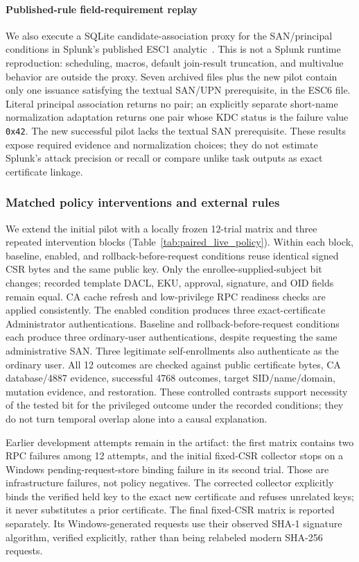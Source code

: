 \paragraph{Published-rule field-requirement replay}
We also execute a SQLite candidate-association proxy for the SAN/principal conditions in Splunk's published ESC1 analytic~\cite{splunk2026esc1}. This is not a Splunk runtime reproduction: scheduling, macros, default join-result truncation, and multivalue behavior are outside the proxy. Seven archived files plus the new pilot contain only one issuance satisfying the textual SAN/UPN prerequisite, in the ESC6 file. Literal principal association returns no pair; an explicitly separate short-name normalization adaptation returns one pair whose KDC status is the failure value \texttt{0x42}. The new successful pilot lacks the textual SAN prerequisite. These results expose required evidence and normalization choices; they do not estimate Splunk's attack precision or recall or compare unlike task outputs as exact certificate linkage.



\subsubsection{Matched policy interventions and external rules}
We extend the initial pilot with a locally frozen 12-trial matrix and three repeated intervention blocks (Table~\ref{tab:paired_live_policy}). Within each block, baseline, enabled, and rollback-before-request conditions reuse identical signed CSR bytes and the same public key. Only the enrollee-supplied-subject bit changes; recorded template DACL, EKU, approval, signature, and OID fields remain equal. CA cache refresh and low-privilege RPC readiness checks are applied consistently. The enabled condition produces three exact-certificate Administrator authentications. Baseline and rollback-before-request conditions each produce three ordinary-user authentications, despite requesting the same administrative SAN. Three legitimate self-enrollments also authenticate as the ordinary user. All 12 outcomes are checked against public certificate bytes, CA database/4887 evidence, successful 4768 outcomes, target SID/name/domain, mutation evidence, and restoration. These controlled contrasts support necessity of the tested bit for the privileged outcome under the recorded conditions; they do not turn temporal overlap alone into a causal explanation.

Earlier development attempts remain in the artifact: the first matrix contains two RPC failures among 12 attempts, and the initial fixed-CSR collector stops on a Windows pending-request-store binding failure in its second trial. Those are infrastructure failures, not policy negatives. The corrected collector explicitly binds the verified held key to the exact new certificate and refuses unrelated keys; it never substitutes a prior certificate. The final fixed-CSR matrix is reported separately. Its Windows-generated requests use their observed SHA-1 signature algorithm, verified explicitly, rather than being relabeled modern SHA-256 requests.

